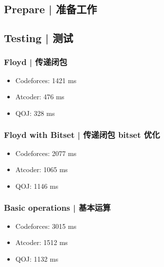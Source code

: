 \documentclass[8pt,a4paper]{article}
\newcommand{\code}[1]{
    
}
\newcommand{\txt}[1]{\par\noindent\footnotesize #1}
\begin{document}
\setlength{\parindent}{0pt}
\setlength{\columnsep}{22pt}
\begin{multicols}{2}

\section{Prepare | 准备工作}

    \subsection{Testing | 测试}

        \subsubsection{Floyd | 传递闭包}
            \txt{\begin{itemize}
                \item Codeforces: 1421 ms
                \item Atcoder: 476 ms
                \item QOJ: 328 ms
            \end{itemize}}
            \code{src/misc/test_floyd.cpp}

        \subsubsection{Floyd with Bitset | 传递闭包 bitset 优化}
            \txt{\begin{itemize}
                \item Codeforces: 2077 ms
                \item Atcoder: 1065 ms
                \item QOJ: 1146 ms
            \end{itemize}}
            \code{src/misc/test_floyd_bitset.cpp}

        \subsubsection{Basic operations | 基本运算}
            \txt{\begin{itemize}
                \item Codeforces: 3015 ms
                \item Atcoder: 1512 ms
                \item QOJ: 1132 ms
            \end{itemize}}
            \code{src/misc/test_normal.cpp}


\end{multicols}
\end{document}
